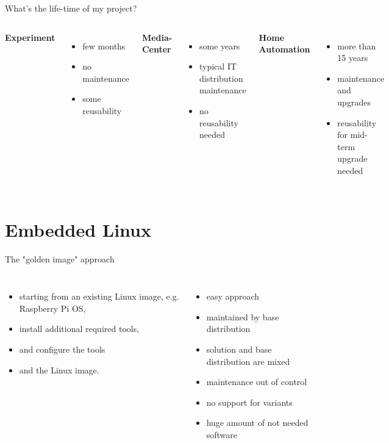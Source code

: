 \documentclass{beamer}
\newcommand\pro{\item[$+$]}
\newcommand\con{\item[$-$]}
\begin{document}
\begin{frame}{What's the life-time of my project?}
	\begin{columns}
        \centering
        \textbf{Experiment}
        \begin{itemize}
        		\item few months
        		\item no maintenance
        		\item some reusability
        \end{itemize}
        \centering
        \textbf{Media-Center}
        \begin{itemize}
        		\item some years
        		\item typical IT distribution maintenance
        		\item no reusability needed
        \end{itemize}
        \centering
        \textbf{Home Automation}
        \begin{itemize}
        		\item more than 15 years
        		\item maintenance and upgrades
        		\item reusability for mid-term upgrade needed
        \end{itemize}
    \end{columns}
\end{frame}

\section{Embedded Linux}


\begin{frame}{The "golden image" approach}
	\begin{columns}
        \centering
        \begin{itemize}
        		\item starting from an existing Linux image, e.g. Raspberry Pi OS,
        		\item install additional required tools,
        		\item and configure the tools
        		\item and the Linux image.
        \end{itemize}
        \centering
        \begin{itemize}
        		\pro easy approach
        		\pro maintained by base distribution
        		\con solution and base distribution are mixed
        		\con maintenance out of control
        		\con no support for variants
        		\con huge amount of not needed software
        \end{itemize}
    \end{columns}
\end{frame}
\end{document}
